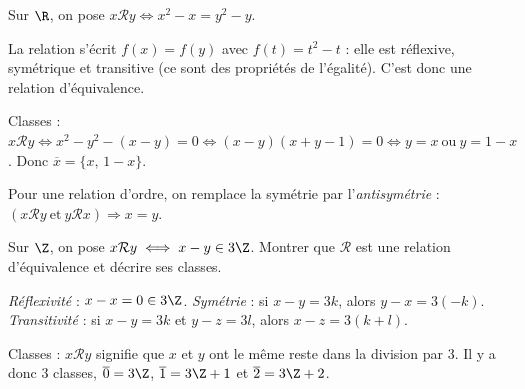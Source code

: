 \begin{exemple}
Sur $\R$, on pose $x\mathcal Ry\iff x^2-x=y^2-y$.

La relation s'écrit $f(x)=f(y)$ avec $f(t)=t^2-t$ : elle est réflexive, symétrique et transitive (ce sont des propriétés de l'égalité). C'est donc une relation d'équivalence.

Classes : $x\mathcal Ry\iff x^2-y^2-(x-y)=0\iff(x-y)(x+y-1)=0\iff y=x\ \text{ou}\ y=1-x$. Donc $\overline{x}=\{x,\,1-x\}$.
\end{exemple}

\begin{remarque}
Pour une relation d'ordre, on remplace la symétrie par l'\emph{antisymétrie} : $(x\mathcal Ry\ \text{et}\ y\mathcal Rx)\Rightarrow x=y$.
\end{remarque}

\begin{exercice}[Application]
Sur $\Z$, on pose $x\mathcal Ry\iff x-y\in3\Z$. Montrer que $\mathcal R$ est une relation d'équivalence et décrire ses classes.
\begin{correction}
\emph{Réflexivité} : $x-x=0\in3\Z$. \emph{Symétrie} : si $x-y=3k$, alors $y-x=3(-k)$. \emph{Transitivité} : si $x-y=3k$ et $y-z=3l$, alors $x-z=3(k+l)$.

Classes : $x\mathcal Ry$ signifie que $x$ et $y$ ont le même reste dans la division par $3$. Il y a donc $3$ classes, $\overline0=3\Z$, $\overline1=3\Z+1$ et $\overline2=3\Z+2$.
\end{correction}
\end{exercice}
